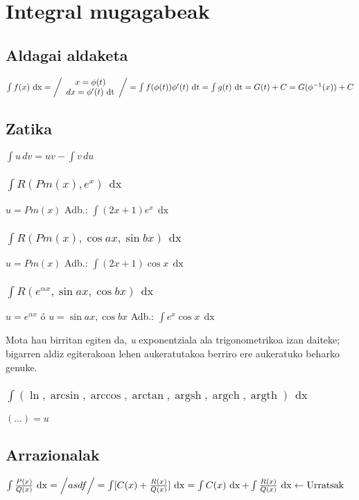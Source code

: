 \documentclass[8pt]{article}
\DeclareMathOperator{\xder}{\, \mathrm{d}x}
\DeclareMathOperator{\tder}{\, \mathrm{d}t}
\DeclareMathOperator{\argsh}{argsh}
\DeclareMathOperator{\argch}{argch}
\DeclareMathOperator{\argth}{argth}
\begin{document}
	\section{Integral mugagabeak}
		\subsection{Aldagai aldaketa}
			$ \int f(x) \xder = \left/
				\begin{array}{c}
					x = \phi (t) \\
					dx = \phi'(t) \tder
				\end{array}
				\right/
				= \int f(\phi(t)) \phi' (t) \tder =
				\int g(t) \tder = G (t) + C = G (\phi^{-1} (x)) + C
			$
		\subsection{Zatika}
			$ \int u \, dv = uv - \int v \, du $

			\subsubsection{$ \int R (Pm(x), e^x) \xder$}
				$ u = Pm(x) $ \quad 
				Adb.: $ \int (2x + 1) e^x \xder $
			\subsubsection{$ \int R (Pm(x), \cos ax, \sin bx) \xder $}
				$ u = Pm(x) $ \quad
				Adb.: $ \int (2x + 1) \cos x \xder $
			\subsubsection{$ \int R (e^{\alpha x}, \sin ax, \cos bx) \xder $}
				$ u = e^{\alpha x} $ ó $ u = \sin ax, \cos bx $ \quad
				Adb.: $ \int e^x \cos x \xder $

				Mota hau birritan egiten da, \textit{u} exponentziala ala
				trigonometrikoa izan daiteke; bigarren aldiz egiterakoan
				lehen aukeratutakoa berriro ere aukeratuko beharko genuke.

			\subsubsection{$ \int (\ln, \arcsin, \arccos, \arctan, \argsh, \argch, \argth ) \xder $}
				$ ( \dots ) = u $
		\subsection{Arrazionalak}
			$ \int \frac{P(x)}{Q(x)} \xder =
				\Big{/}
					asdf
				\Big{/}
				= \int [ C(x) + \frac{R(x)}{Q(x)} ] \xder =
				\int C(x) \xder + \int \frac{R(x)}{Q(x)} \xder \leftarrow \text{Urratsak} $
\end{document}
